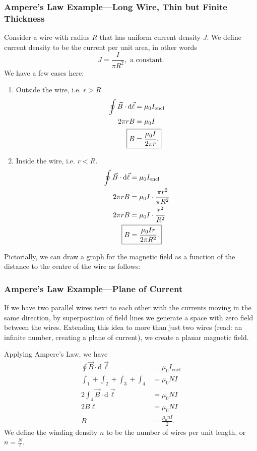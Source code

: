 \documentclass[class=article, crop=false]{standalone}
\begin{document}
  \subsubsection{Ampere's Law Example---Long Wire, Thin but Finite Thickness}
  Consider a wire with radius $R$ that has uniform current density $J$. We define current density to be the current per unit area, in other words
  \[
    J = \frac{I}{\pi R^2}, \text{ a constant}.
  \]
  We have a few cases here:
  \begin{enumerate}[label=(\alph*)]
    \item Outside the wire, i.e. $r > R$.
    \begin{align*}
      \oint \vec{B}\cdot \mathrm{d}\vec{\ell} &= \mu_0I_\text{encl} \\
      2\pi rB &= \mu_0I \\
      \Aboxed{B &= \frac{\mu_0I}{2\pi r}.}
    \end{align*}
    \item Inside the wire, i.e. $r < R$.
    \begin{align*}
      \oint \vec{B}\cdot \mathrm{d}\vec{\ell} &= \mu_0I_\text{encl} \\
      2\pi rB &= \mu_0I\cdot \frac{\pi r^2}{\pi R^2} \\
      2\pi rB &= \mu_0I\cdot \frac{r^2}{R^2} \\
      \Aboxed{B &= \frac{\mu_0Ir}{2\pi R^2}.}
    \end{align*}
  \end{enumerate}
  Pictorially, we can draw a graph for the magnetic field as a function of the distance to the centre of the wire as follows:
  \begin{center}\end{center}
  \subsubsection{Ampere's Law Example---Plane of Current}
  If we have two parallel wires next to each other with the currents moving in the same direction, by superposition of field lines we generate a space with zero field between the wires. Extending this idea to more than just two wires (read: an infinite number, creating a plane of current), we create a planar magnetic field. 
  \begin{center}\end{center}
  Applying Ampere's Law, we have
  \begin{align*}
    \oint \vec{B}\cdot \mathrm{d}\vec{\ell} &= \mu_0I_\text{encl} \\
    \int_1 + \int_2 + \int_3 + \int_4 &= \mu_0NI\\
    2\int_4 \vec{B}\cdot \mathrm{d}\vec{\ell} &= \mu_0NI\\
    2B\ell &= \mu_0NI \\
    B &= \frac{\mu_0nI}{2}.
  \end{align*}
  We define the winding density $n$ to be the number of wires per unit length, or $n = \frac{N}{\ell}$.
\end{document}
